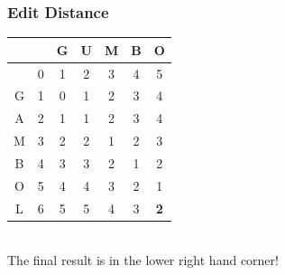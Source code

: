 \begin{frame}[fragile]
\frametitle{Edit Distance}
\begin{tabular}{|c|c|c|c|c|c|c|}
\hline
 & & G & U & M & B & O\\
\hline
 & 0 & 1 & 2 & 3 & 4 & 5\\
\hline
G & 1 & 0 & 1 & 2 & 3 & 4\\
\hline
A & 2 & 1 & 1 & 2 & 3 & 4\\
\hline
M & 3 & 2 & 2 & 1 & 2 & 3\\
\hline
B & 4 & 3 & 3 & 2 & 1 & 2\\
\hline
O & 5 & 4 & 4 & 3 & 2 & 1\\
\hline
L & 6 & 5 & 5 & 4 & 3 & {\bf 2}\\
\hline
\end{tabular}\\
\vspace{3mm}
The final result is in the lower right hand corner!
\end{frame}

